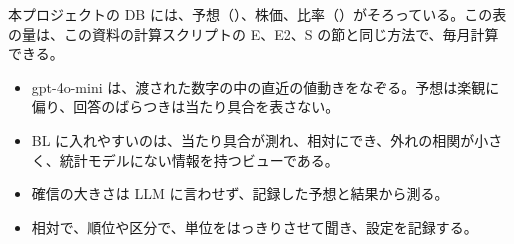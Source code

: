 本プロジェクトの DB には、予想（）、株価、比率（）がそろっている。この表の量は、この資料の計算スクリプトの E、E2、S の節と同じ方法で、毎月計算できる。

\begin{keybox}[この章のまとめ]
\begin{itemize}
\item gpt-4o-mini は、渡された数字の中の直近の値動きをなぞる。予想は楽観に偏り、回答のばらつきは当たり具合を表さない。
\item BL に入れやすいのは、当たり具合が測れ、相対にでき、外れの相関が小さく、統計モデルにない情報を持つビューである。
\item 確信の大きさは LLM に言わせず、記録した予想と結果から測る。
\item 相対で、順位や区分で、単位をはっきりさせて聞き、設定を記録する。
\end{itemize}
\end{keybox}
